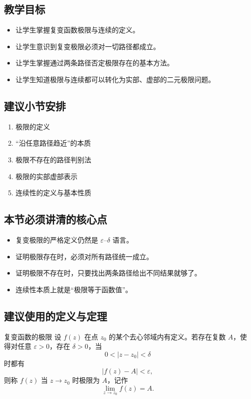 \subsection*{教学目标}
\begin{itemize}
    \item 让学生掌握复变函数极限与连续的定义。
    \item 让学生意识到复变极限必须对一切路径都成立。
    \item 让学生掌握通过两条路径否定极限存在的基本方法。
    \item 让学生知道极限与连续都可以转化为实部、虚部的二元极限问题。
\end{itemize}

\subsection*{建议小节安排}
\begin{enumerate}
    \item 极限的定义
    \item ``沿任意路径趋近''的本质
    \item 极限不存在的路径判别法
    \item 极限的实部虚部表示
    \item 连续性的定义与基本性质
\end{enumerate}

\subsection*{本节必须讲清的核心点}
\begin{itemize}
    \item 复变极限的严格定义仍然是 $\varepsilon$--$\delta$ 语言。
    \item 证明极限存在时，必须对所有路径统一成立。
    \item 证明极限不存在时，只要找出两条路径给出不同结果就够了。
    \item 连续性本质上就是``极限等于函数值''。
\end{itemize}

\subsection*{建议使用的定义与定理}
\begin{dingliyi}{复变函数的极限}{}
设 $f(z)$ 在点 $z_0$ 的某个去心邻域内有定义。若存在复数 $A$，使得对任意 $\varepsilon>0$，存在 $\delta>0$，当
\[
    0<|z-z_0|<\delta
\]
时都有
\[
    |f(z)-A|<\varepsilon,
\]
则称 $f(z)$ 当 $z\to z_0$ 时极限为 $A$，记作
\[
    \lim_{z\to z_0}f(z)=A.
\]
\end{dingliyi}

